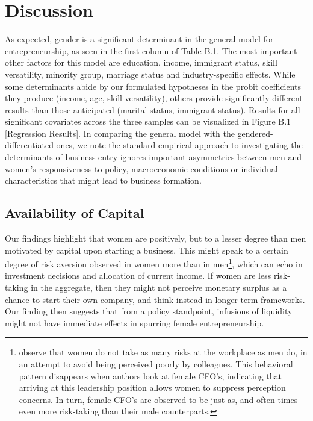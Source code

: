\chapter{Discussion\label{ch:disc}}

As expected, gender is a significant determinant in the general model for entrepreneurship, as seen in the first column of Table B.1. The most important other factors for this model are education, income, immigrant status, skill versatility, minority group, marriage status and industry-specific effects. While some determinants abide by our formulated hypotheses in the probit coefficients they produce (income, age, skill versatility), others provide significantly different results than those anticipated (marital status, immigrant status). Results for all significant covariates across the three samples can be visualized in Figure B.1 [Regression Results]. In comparing the general model with the gendered-differentiated ones, we note the standard empirical approach to investigating the determinants of business entry ignores important asymmetries between men and women's responsiveness to policy, macroeconomic conditions or individual characteristics that might lead to business formation. 

\section{Availability of Capital}
Our findings highlight that women are positively, but to a lesser degree than men motivated by capital upon starting a business. This might speak to a certain degree of risk aversion observed in women more than in men\footnote{\cite{adams2012beyond} observe that women do not take as many risks at the workplace as men do, in an attempt to avoid being perceived poorly by colleagues. This behavioral pattern disappears when authors look at female CFO's, indicating that arriving at this leadership position allows women to suppress perception concerns. In turn, female CFO's are observed to be just as, and often times even more risk-taking than their male counterparts.}, which can echo in investment decisions and allocation of current income. If women are less risk-taking in the aggregate, then they might not perceive monetary surplus as a chance to start their own company, and think instead in longer-term frameworks. Our finding then suggests that from a policy standpoint, infusions of liquidity might not have immediate effects in spurring female entrepreneurship. 

